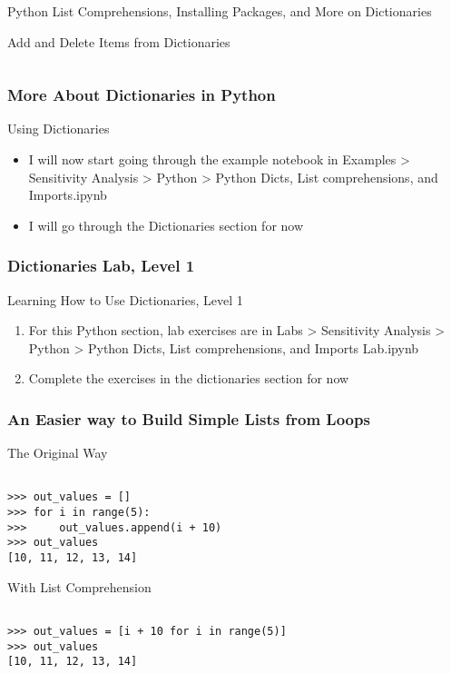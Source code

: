 \documentclass[handout, 11pt]{beamer}
\begin{document}
\begin{section}{Python List Comprehensions, Installing Packages, and More on Dictionaries}
\begin{frame}[fragile]
\begin{block}{Add and Delete Items from Dictionaries}
\begin{verbatim}
\end{verbatim}
\end{block}
\end{frame}
\begin{frame}
\frametitle{More About Dictionaries in Python}
{
\begin{block}{Using Dictionaries}
\begin{itemize}
\item I will now start going through the example notebook in Examples > Sensitivity Analysis > Python > Python Dicts, List comprehensions, and Imports.ipynb
\item I will go through the Dictionaries section for now
\end{itemize}
\end{block}
}
\end{frame}
\begin{frame}
\frametitle{Dictionaries Lab, Level 1}
{
\begin{block}{Learning How to Use Dictionaries, Level 1}
\begin{enumerate}
\item For this Python section, lab exercises are in Labs > Sensitivity Analysis > Python > Python Dicts, List comprehensions, and Imports Lab.ipynb
\item Complete the exercises in the dictionaries section for now
\end{enumerate}
\vfill
\end{block}
}
\label{labs:python:dicts-1}
\end{frame}
\begin{frame}[fragile]
\frametitle{An Easier way to Build Simple Lists from Loops}
\small
\begin{block}{The Original Way}
\begin{verbatim}

>>> out_values = []
>>> for i in range(5):
>>>     out_values.append(i + 10)
>>> out_values
[10, 11, 12, 13, 14]

\end{verbatim}
\end{block}
\begin{block}{With List Comprehension}
\begin{verbatim}

>>> out_values = [i + 10 for i in range(5)]
>>> out_values
[10, 11, 12, 13, 14]


\end{verbatim}
\end{block}
\end{frame}
\end{section}
\end{document}
